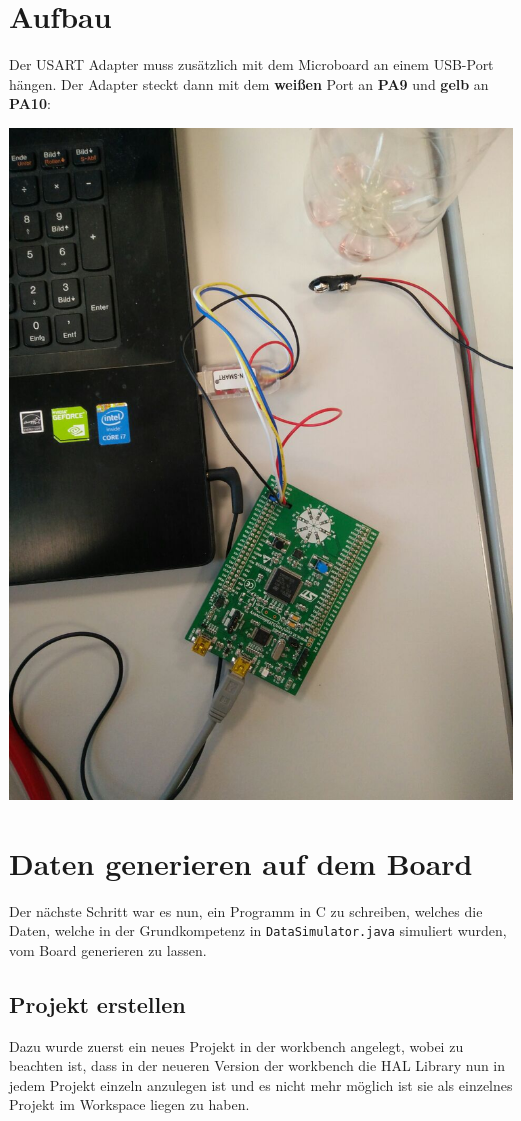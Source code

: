 
\section{Aufbau}
Der USART Adapter muss zusätzlich mit dem Microboard an einem USB-Port hängen. Der Adapter steckt dann mit dem \textbf{weißen} Port an \textbf{PA9} und \textbf{gelb} an \textbf{PA10}:

\begin{minipage}{\linewidth}
	\centering
	\includegraphics[width=0.8\linewidth]{images/aufbau}
\end{minipage}


\section{Daten generieren auf dem Board}
Der nächste Schritt war es nun, ein Programm in C zu schreiben, welches die Daten, welche in der Grundkompetenz in \verb|DataSimulator.java| simuliert wurden, vom Board generieren zu lassen. 

\subsection{Projekt erstellen}
Dazu wurde zuerst ein neues Projekt in der workbench angelegt, wobei zu beachten ist, dass in der neueren Version der workbench die HAL Library nun in jedem Projekt einzeln anzulegen ist und es nicht mehr möglich ist sie als einzelnes Projekt im Workspace liegen zu haben.

